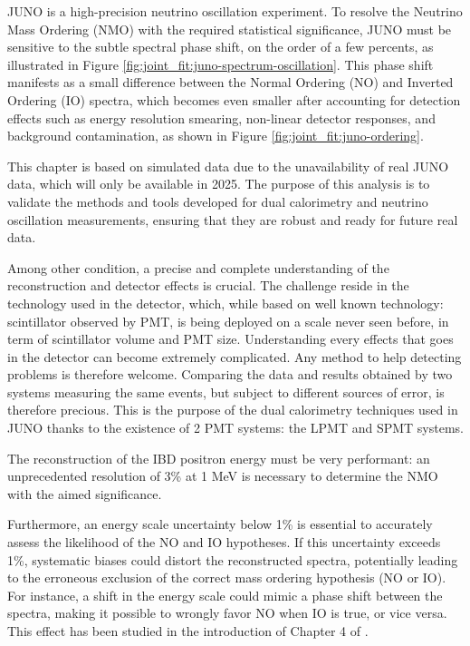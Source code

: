 \documentclass[../main.tex]{subfiles}
\begin{document}
JUNO is a high-precision neutrino oscillation experiment. To resolve the Neutrino Mass Ordering (NMO) with the required statistical significance, JUNO must be sensitive to the subtle spectral phase shift, on the order of a few percents, as illustrated in Figure \ref{fig:joint_fit:juno-spectrum-oscillation}. This phase shift manifests as a small difference between the Normal Ordering (NO) and Inverted Ordering (IO) spectra, which becomes even smaller after accounting for detection effects such as energy resolution smearing, non-linear detector responses, and background contamination, as shown in Figure \ref{fig:joint_fit:juno-ordering}.


This chapter is based on simulated data due to the unavailability of real JUNO data, which will only be available in 2025. The purpose of this analysis is to validate the methods and tools developed for dual calorimetry and neutrino oscillation measurements, ensuring that they are robust and ready for future real data.

Among other condition, a precise and complete understanding of the reconstruction and detector effects is crucial.
The challenge reside in the technology used in the detector, which, while based on well known technology: scintillator observed by PMT, is being deployed on a scale never seen before, in term of scintillator volume and  PMT size. Understanding every effects that goes in the detector can become extremely complicated. Any method to help detecting problems is therefore welcome.
Comparing the data and results obtained by two systems measuring the same events, but subject to different sources of error, is therefore precious. This is the purpose of the dual calorimetry techniques used in JUNO thanks to the existence of 2 PMT systems: the LPMT and SPMT systems.

The reconstruction of the IBD positron energy must be very performant: an unprecedented resolution of 3\% at 1 MeV \cite{juno_collaboration_juno_2022} is necessary to determine the NMO with the aimed significance.

Furthermore, an energy scale uncertainty below 1\% is essential to accurately assess the likelihood of the NO and IO hypotheses. If this uncertainty exceeds 1\%, systematic biases could distort the reconstructed spectra, potentially leading to the erroneous exclusion of the correct mass ordering hypothesis (NO or IO). For instance, a shift in the energy scale could mimic a phase shift between the spectra, making it possible to wrongly favor NO when IO is true, or vice versa. This effect has been studied in the introduction of Chapter 4 of \cite{han_dual_2021}.
\end{document}
